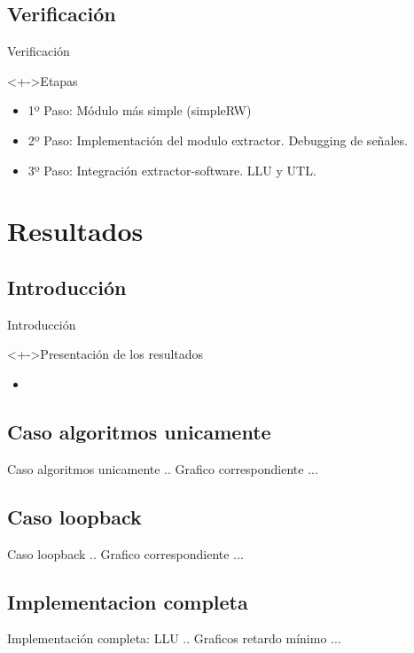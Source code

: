 \documentclass[xcolor=dvipsnames]{beamer}
\begin{document}
\subsection{Verificación}
\begin{frame}{Verificación}
\begin{block}<+->{Etapas}   
    \begin{itemize}
      \scriptsize
     	\item 1º Paso: Módulo más simple (simpleRW)
     	\item 2º Paso: Implementación del modulo extractor. Debugging de señales.
     	\item 3º Paso: Integración extractor-software. LLU y UTL.
    \end{itemize}
  \end{block}
\end{frame}

\section{Resultados}
\subsection{Introducción}
\begin{frame}{Introducción}
  \begin{block}<+->{Presentación de los resultados}   
    \begin{itemize}
      \scriptsize
     	\item     	
    \end{itemize}
  \end{block}
\end{frame}

\subsection{Caso algoritmos unicamente}
\begin{frame}{Caso algoritmos unicamente} 
 .. Grafico correspondiente ...
\end{frame}

\subsection{Caso loopback}
\begin{frame}{Caso loopback} 
 .. Grafico correspondiente ...
\end{frame}

\subsection{Implementacion completa}
\begin{frame}{Implementación completa: LLU} 
 .. Graficos retardo mínimo ...
\end{frame}
\end{document}
